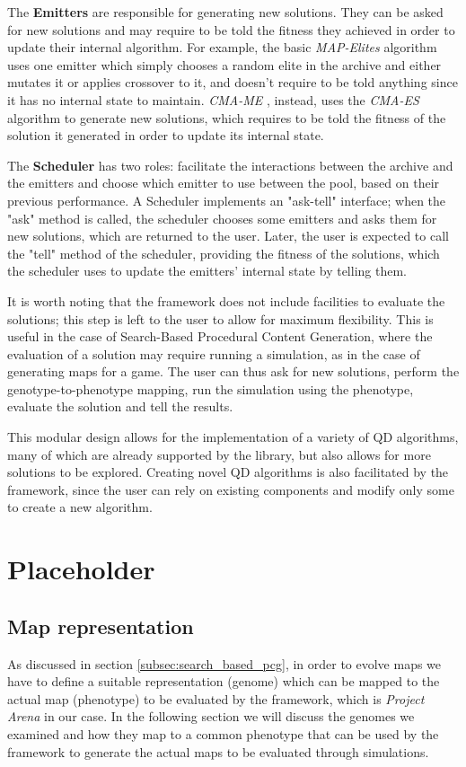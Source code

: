 \documentclass{Configuration_Files/PoliMi3i_thesis}
\begin{document}
The \textbf{Emitters} are responsible for generating new solutions. They can be asked for new solutions and may require to be told the fitness they achieved in order to update their internal algorithm. 
For example, the basic \textit{MAP-Elites} \cite{mouret_illuminating_2015} algorithm uses one emitter which simply chooses a random elite in the archive and either mutates it or applies crossover to it, and doesn't require to be told anything since it has no internal state to maintain. 
\textit{CMA-ME} \cite{fontaine_covariance_2020}, instead, uses the \textit{CMA-ES} algorithm to generate new solutions, which requires to be told the fitness of the solution it generated in order to update its internal state.

The \textbf{Scheduler} has two roles: facilitate the interactions between the archive and the emitters and choose which emitter to use between the pool, based on their previous performance.
A Scheduler implements an "ask-tell" interface; when the "ask" method is called, the scheduler chooses some emitters and asks them for new solutions, which are returned to the user. Later, the user is expected to call the "tell" method of the scheduler, providing the fitness of the solutions, which the scheduler uses to update the emitters' internal state by telling them.

It is worth noting that the framework does not include facilities to evaluate the solutions; this step is left to the user to allow for maximum flexibility. This is useful in the case of Search-Based Procedural Content Generation, where the evaluation of a solution may require running a simulation, as in the case of generating maps for a game. The user can thus ask for new solutions, perform the genotype-to-phenotype mapping, run the simulation using the phenotype, evaluate the solution and tell the results. 

This modular design allows for the implementation of a variety of QD algorithms, many of which are already supported by the library, but also allows for more solutions to be explored. Creating novel QD algorithms is also facilitated by the framework, since the user can rely on existing components and modify only some to create a new algorithm.

\chapter{Placeholder}

\section{Map representation}
\label{sec:map_genomes}
As discussed in section \ref{subsec:search_based_pcg}, in order to evolve maps we have to define a suitable representation (genome) which can be mapped to the actual map (phenotype) to be evaluated by the framework, which is \textit{Project Arena} in our case. In the following section we will discuss the genomes we examined and how they map to a common phenotype that can be used by the framework to generate the actual maps to be evaluated through simulations.
\end{document}
